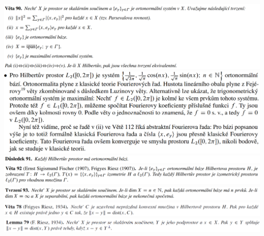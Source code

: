 \documentclass[12pt,a4paper]{article}
\begin{document}
\begin{center}
		\includegraphics[width=\textwidth]{img/3hilp/Image 012.png}\vspace{0.3cm}
		\includegraphics[width=\textwidth]{img/3hilp/2020-06-21 13 06 53.png}\vspace{0.3cm}
		\includegraphics[width=\textwidth]{img/3hilp/Image 013.png}\vspace{0.3cm}
		\includegraphics[width=\textwidth]{img/3hilp/Image 014.png}\vspace{0.3cm}
		\includegraphics[width=\textwidth]{img/3hilp/Image 015.png}\vspace{0.3cm}
		\includegraphics[width=\textwidth]{img/3hilp/2020-06-21 13 02 26.png}\vspace{0.3cm}
		\includegraphics[width=\textwidth]{img/3hilp/2020-06-21 13 02 35.png}\vspace{0.3cm}
	\end{center}
\end{document}
